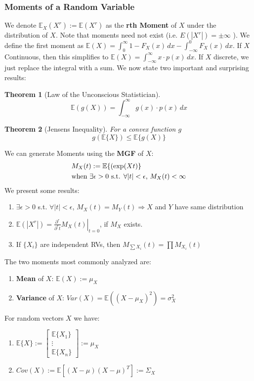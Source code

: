 \documentclass[]{article}
\theoremstyle{mattstyle}
\newtheorem{theorem}{Theorem}[section]
\theoremstyle{definition}
\begin{document}
\subsubsection{Moments of a Random Variable}
We denote \(\mathbb{E}_X(X^r) := \mathbb{E}(X^r)\) as the \textbf{rth Moment} of \(X\) under the distribution of \(X\). Note that moments need not exist (i.e. \(E(|X^r|)=\pm\infty\) ). We define the first moment as \(\mathbb{E}(X) = \int_0^\infty 1 - F_X(x)\,dx - \int_{-\infty}^0 F_X(x)\,dx\). If \(X\) Continuous, then this simplifies to \(\mathbb{E}(X) = \int_{-\infty}^{\infty} x \cdot p(x)\,dx\). If $X$ discrete, we just replace the integral with a sum. We now state two important and surprising results:
\begin{theorem}[Law of the Unconscious Statistician]
$$\mathbb{E}(g(X)) = \int_{-\infty}^{\infty} g(x) \cdot p(x)\,dx$$
\end{theorem}
\begin{theorem}[Jensens Inequality]
	For a convex function $g$ $$g(\mathbb{E}\{X\})\le\mathbb{E}\{g(X)\}$$
\end{theorem}
\newpage
We can generate Moments using the \textbf{MGF} of $X$:
\begin{align*}
&M_X(t) := \mathbb{E} \{(\exp(Xt)\} \\
&\text{when \( \exists \epsilon >0 \) s.t. \( \forall |t| < \epsilon\),  \(M_X(t) < \infty \)}
\end{align*}
We present some results:
\begin{enumerate}
	\item \( \exists \epsilon >0 \) s.t. \( \forall |t| < \epsilon\),  \(M_X(t) = M_Y(t) \Rightarrow X\) and \(Y\) have same distribution
	\item \(\mathbb{E}(|X^r|) = \left.\frac{\partial^r}{\partial^r t}M_X(t)\right\rvert_{t=0}\), if \(M_X\) exists.
	\item If \(\{ X_i\}\) are independent RVs, then \( M_{\sum X_i} (t) = \prod M_{X_i}(t)\)
\end{enumerate}
The two moments most commonly analyzed are:
\begin{enumerate}
	\item \textbf{Mean} of \(X\): \(\mathbb{E}(X):=\mu_X\)
	\item \textbf{Variance} of \(X\): \(Var(X)=\mathbb{E}((X-\mu_{X})^2)=\sigma^2_{X}\)
\end{enumerate}
For random vectors \(X\) we have:
\begin{enumerate}
	\item \(\mathbb{E}\{X\} := \begin{bmatrix}
	\mathbb{E}\{X_1\} \\
	\vdots \\
	\mathbb{E}\{X_n\}
	\end{bmatrix} := \mu_X\)
	\item \(Cov(X) := \mathbb{E}[(X-\mu)(X-\mu)^T] := \Sigma_X\)
\end{enumerate}
\end{document}
